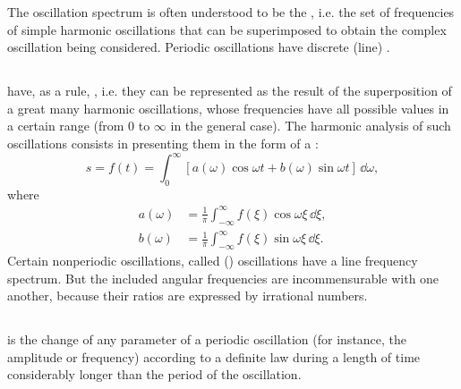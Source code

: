 The oscillation spectrum is often understood to be the , i.e. the set of frequencies of simple harmonic oscillations that can be superimposed to obtain the complex oscillation being considered. Periodic oscillations have discrete (line) .

\subsection{}\label{28.4.7}  have, as a rule, , i.e. they can be represented as the result of the superposition of a great many harmonic oscillations, whose frequencies have all possible values in a certain range (from 0 to $\infty$ in the general case). The harmonic analysis of such oscillations consists in presenting them in the form of a :
\begin{equation*}%
s = f(t) = \int_{0}^{\infty} [a(\omega) \cos \omega t + b(\omega) \sin \omega t] \, \dd \omega,
\end{equation*}
where
\begin{align*}%
a(\omega) & = \frac{1}{\pi} \int_{-\infty}^{\infty} f(\xi) \cos \omega \xi \, \dd \xi,\\
b(\omega) & = \frac{1}{\pi} \int_{-\infty}^{\infty} f(\xi) \sin \omega \xi \, \dd \xi.
\end{align*}
Certain nonperiodic oscillations, called  () oscillations have a line frequency spectrum. But the included angular frequencies are incommensurable with one another, because their ratios are expressed by irrational numbers. 


\subsection{}\label{28.4.8}  is the change of any parameter of a periodic oscillation (for instance, the amplitude or frequency) according to a definite law during a length of time considerably longer than the period of the oscillation.

